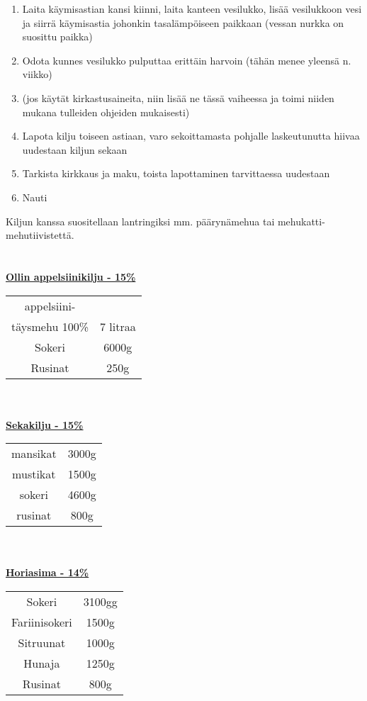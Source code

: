 \documentclass[20pt, a4]{article}
\begin{document}
{\begin{enumerate}
     \item Laita käymisastian kansi kiinni, laita kanteen vesilukko, lisää vesilukkoon vesi ja siirrä käymisastia johonkin tasalämpöiseen paikkaan (vessan nurkka on suosittu paikka)
     \item Odota kunnes vesilukko pulputtaa erittäin harvoin (tähän menee yleensä n. viikko)
     \item (jos käytät kirkastusaineita, niin lisää ne tässä vaiheessa ja toimi niiden mukana tulleiden ohjeiden mukaisesti)
     \item Lapota kilju toiseen astiaan, varo sekoittamasta pohjalle laskeutunutta hiivaa uudestaan kiljun sekaan
     \item Tarkista kirkkaus ja maku, toista lapottaminen tarvittaessa uudestaan
     \item Nauti
    \end{enumerate}
    Kiljun kanssa suositellaan lantringiksi mm. päärynämehua tai mehukatti-mehutiivistettä.


    \pagebreak
    \section{}
    \underline{\textbf{Ollin appelsiinikilju - 15\%}}

    \begin{tabular}{ cc } 
        appelsiini-\\
        täysmehu 100\% & 7 litraa\\
        Sokeri & 6000g\\
        Rusinat & 250g\\
    \end{tabular}
    \\
    \\
    \underline{\textbf{Sekakilju - 15\%}}


    \begin{tabular}{ cc } 
        mansikat & 3000g  \\
        mustikat & 1500g \\
        sokeri & 4600g \\
        rusinat & 800g \\
    \end{tabular}
    \\
    \\
    \underline{\textbf{Horiasima - 14\%}}

    \begin{tabular}{ cc } 
        Sokeri & 3100gg \\
        Fariinisokeri & 1500g\\
        Sitruunat & 1000g \\
        Hunaja & 1250g \\
        Rusinat & 800g
    \end{tabular}
    \\

}
\end{document}
